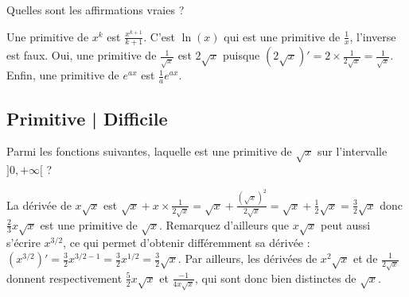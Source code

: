 \begin{question}
Quelles sont les affirmations vraies ?
\begin{answers}  
\end{answers}
\begin{explanations}
Une primitive de $x^k$ est $\frac{x^{k+1}}{k+1}$.
C'est $\ln(x)$ qui est une primitive de $\frac{1}{x}$, l'inverse est faux.
Oui, une primitive de $\frac{1}{\sqrt x}$ est $2\sqrt{x}$ puisque $(2 \sqrt{x})' = 2 \times \frac{1}{2\sqrt{x}} = \frac{1}{\sqrt{x}}$.
Enfin, une primitive de $e^{ax}$ est $\frac1a e^{ax}$.
\end{explanations}
\end{question}


\subsection{Primitive | Difficile}

\begin{question}
Parmi les fonctions suivantes, laquelle est une primitive de $\sqrt x$ sur l'intervalle $]0,+\infty[$ ?
\begin{answers}  
\end{answers}
\begin{explanations} La dérivée de $x\sqrt x$ est $\sqrt x+x\times \frac 1{2\sqrt x}=\sqrt x+ \frac {(\sqrt x)^2}{2\sqrt x}=\sqrt x+\frac 12\sqrt x= \frac 32\sqrt x$ donc $\frac 23x\sqrt x$ est une primitive de  $\sqrt x$. Remarquez d'ailleurs que $x \sqrt{x}$ peut aussi s'écrire $x^{3/2}$, ce qui permet d'obtenir différemment sa dérivée : $(x^{3/2})' = \frac{3}{2} x^{3/2 - 1}= \frac{3}{2} x^{1/2} = \frac{3}{2} \sqrt{x}$. Par ailleurs, les dérivées de $x^2\sqrt x$ et de $\frac 1{2\sqrt x}$ donnent respectivement $\frac{5}{2} x \sqrt{x}$ et $\frac{-1}{4x \sqrt{x}}$, qui sont donc bien distinctes de $\sqrt{x}$.
\end{explanations}
\end{question}


